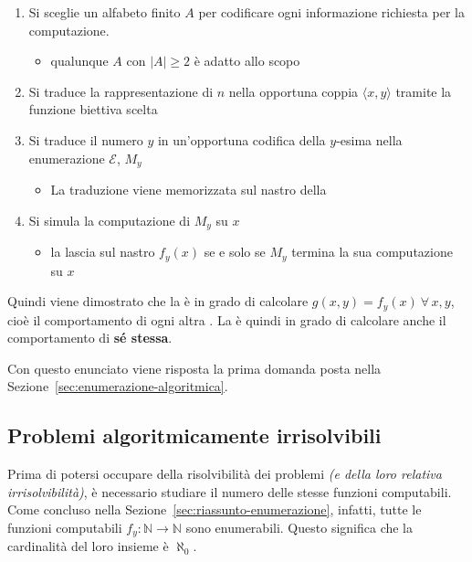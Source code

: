 \documentclass[italian, 10pt]{article}
\begin{document}
\begin{enumerate}
  \item Si sceglie un alfabeto finito \(A\) per codificare ogni informazione richiesta per la computazione.
        \begin{itemize}[label=\(\rightarrow\)]
          \item qualunque \(A\) con \(|A| \geq 2\) è adatto allo scopo
        \end{itemize}
  \item Si traduce la rappresentazione di \(n\) nella opportuna coppia \(\langle x, y \rangle\) tramite la funzione biettiva scelta
  \item Si traduce il numero \(y\) in un'opportuna codifica della \TM \(y\)-esima nella enumerazione \(\mathscr{E}\), \(M_y\)
        \begin{itemize}[label=\(\rightarrow\)]
          \item La traduzione viene memorizzata sul nastro della \UTM
        \end{itemize}
  \item Si simula la computazione di \(M_y\) su \(x\)
        \begin{itemize}[label=\(\rightarrow\)]
          \item la \UTM lascia sul nastro \(f_y(x)\) se e solo se \(M_y\) termina la sua computazione su \(x\)
        \end{itemize}
\end{enumerate}

Quindi viene dimostrato che la \UTM è in grado di calcolare \(g(x, y) = f_y(x) \ \forall \, x, y\), cioè il comportamento di ogni altra \TM.
La \UTM è quindi in grado di calcolare anche il comportamento di \textbf{sé stessa}.

\bigskip
Con questo enunciato viene risposta la prima domanda posta nella Sezione~\ref{sec:enumerazione-algoritmica}.

\subsection{Problemi algoritmicamente irrisolvibili}

Prima di potersi occupare della risolvibilità dei problemi \textit{(e della loro relativa irrisolvibilità)}, è necessario studiare il numero delle stesse funzioni computabili.
Come concluso nella Sezione~\ref{sec:riassunto-enumerazione}, infatti, tutte le funzioni computabili \(f_y : \mathbb{N} \rightarrow \mathbb{N}\) sono enumerabili.
Questo significa che la cardinalità del loro insieme è \(\aleph_0\).
\end{document}
